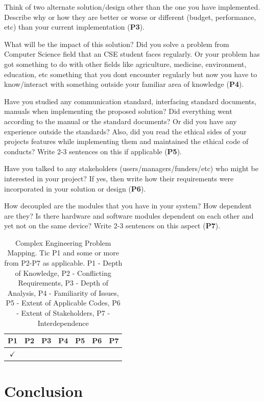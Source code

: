 \documentclass[conference]{IEEEtran}
\begin{document}
Think of two alternate solution/design other than the one you have implemented. Describe why or how they are better or worse or different (budget, performance, etc) than your current implementation (\textbf{P3}).

What will be the impact of this solution? Did you solve a problem from Computer Science field that an CSE student faces regularly. Or your problem has got something to do with other fields like agriculture, medicine, environment, education, etc something that you dont encounter regularly but now you have to know/interact with something outside your  familiar area of knowledge (\textbf{P4}).

Have you studied any communication standard, interfacing standard documents, manuals when implementing the proposed solution? Did everything went according to the manual or the standard documents? Or did you have any experience outside the standards? Also, did you read the ethical sides of your projects features while implementing them and maintained the ethical code of conducts? Write 2-3 sentences on this if applicable (\textbf{P5}).

Have you talked to any stakeholders (users/managers/funders/etc) who might be interested in your project? If yes, then write how their requirements were incorporated in your solution or design (\textbf{P6}).

How decoupled are the modules that you have in your system? How dependent are they? Is there hardware and software modules dependent on each other and yet not on the same device? Write 2-3 sentences on this aspect (\textbf{P7}). 



\begin{table}[h]
    \begin{center}
    \begin{tabular}{|c|c|c|c|c|c|c|}
\hline  
P1&P2&P3&P4&P5&P6&P7\\
\hline 
$\checkmark$&&&&&&\\
\hline 
\end{tabular}
\end{center}
    \caption{Complex Engineering Problem Mapping. Tic P1 and some or more from P2-P7 as applicable. P1 - Depth of Knowledge, P2 - Conflicting Requirements, P3 - Depth of Analysis, P4 - Familiarity of Issues, P5 - Extent of Applicable Codes, P6 - Extent of Stakeholders, P7 - Interdependence}
    \label{tab:cep}
\end{table}

\section{Conclusion}
\end{document}
